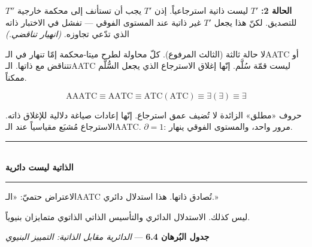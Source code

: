\documentclass[10pt, openany, oneside]{book}
\renewcommand{\normalsize}{\fontsize{10}{13}\selectfont}
\begin{document}
\textbf{الحالة 2:} $T'$ ليست ذاتية استرجاعياً. إذن $T'$ يجب أن تستأنف إلى محكمة خارجية $T''$ للتصديق. لكنّ هذا يجعل $T'$ غير ذاتية عند المستوى الفوقي --- تفشل في الاختبار ذاته الذي تدّعي تجاوزه. \textit{(انهيار تناقضي.)}

لا حالة ثالثة (الثالث المرفوع). كلّ محاولة لطرح ميتا-محكمة إمّا تنهار في الـAATC أو تتناقض مع ذاتها. الـAATC ليست قمّة سُلَّم. إنّها إغلاق الاسترجاع الذي يجعل السُّلَّم ممكناً.

$$\text{AAATC} \equiv \text{AATC} \equiv \text{ATC}(\text{ATC}) \equiv \exists(\exists) \equiv \exists$$

حروف «مطلق» الزائدة لا تُضيف عمق استرجاع. إنّها إعادات صياغة دلالية للإغلاق ذاته. الاسترجاع مُشبَع مقياسياً عند الـAATC. $\partial = 1$: مرور واحد، والمستوى الفوقي ينهار.

\vspace{1.5em}


\begin{center}
    \rule{0.3\textwidth}{0.4pt}\\[0.5em]
    {\normalsize\bfseries الذاتية ليست دائرية}\\[0.3em]
    \rule{0.3\textwidth}{0.4pt}
\end{center}

\vspace{1em}

\noindent الاعتراض حتميّ: «الـAATC تُصادق ذاتها. هذا استدلال دائري.»

ليس كذلك. الاستدلال الدائري والتأسيس الذاتي الذاتوي متمايزان بنيوياً.

\vspace{0.5em}

\textbf{جدول البُرهان 6.4} --- \textit{الدائرية مقابل الذاتية: التمييز البنيوي}

\vspace{0.5em}
\end{document}
